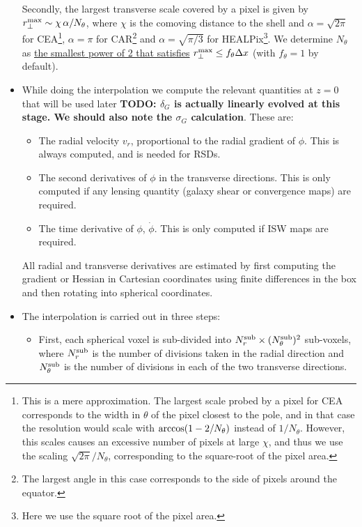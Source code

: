 \documentclass[a4paper,10pt]{article}
\newcommand{\TODO}[1]{{\bf TODO: #1}}
\begin{document}
\begin{itemize}
      Secondly, the largest transverse scale covered by a pixel is given by
      $r_\perp^{\rm max}\sim\chi\,\alpha/N_\theta$, where $\chi$ is the comoving
      distance to the shell and $\alpha=\sqrt{2\pi}$ for CEA\footnote{This is a
        mere approximation. The largest scale probed by a pixel for CEA corresponds
        to the width in $\theta$ of the pixel closest to the pole, and in that 
        case the resolution would scale with ${\rm arccos}(1-2/N_\theta)$ instead
        of $1/N_\theta$. However, this scales causes an excessive number of pixels
        at large $\chi$, and thus we use the scaling $\sqrt{2\pi}/N_\theta$,
        corresponding to the square-root of the pixel area.}, $\alpha=\pi$ for
      CAR\footnote{The largest angle in this case corresponds to the side of
        pixels around the equator.} and $\alpha=\sqrt{\pi/3}$ for
      HEALPix\footnote{Here we use the square root of the pixel area.}. We
      determine $N_\theta$ as \underline{the smallest power of 2 that satisfies}
      $r_\perp^{\rm max}\leq f_\theta\Delta x$ (with $f_\theta=1$ by default).
    \item While doing the interpolation we compute the relevant
      quantities at $z=0$ that will be used later \TODO{$\delta_G$ is actually
        linearly evolved at this stage. We should also note the $\sigma_G$
        calculation}. These are:
      \begin{itemize}
        \item The radial velocity $v_r$, proportional to the radial
          gradient of $\phi$. This is always computed, and is needed
          for RSDs.
        \item The second derivatives of $\phi$ in the transverse directions.
          This is only computed if any lensing quantity (galaxy shear or
          convergence maps) are required.
        \item The time derivative of $\phi$, $\dot{\phi}$. This is only
          computed if ISW maps are required.
      \end{itemize}
      All radial and transverse derivatives are estimated by first computing
      the gradient or Hessian in Cartesian coordinates using finite differences
      in the box and then rotating into spherical coordinates.
      
    \item The interpolation is carried out in three steps:
      \begin{itemize}
        \item First, each spherical voxel is sub-divided into 
          $N_r^{\rm sub}\times (N_\theta^{\rm sub})^2$ sub-voxels, where $N^{\rm sub}_r$
          is the number of divisions taken in the radial direction and $N^{\rm sub}_\theta$ is
          the number of divisions in each of the two transverse directions.
          

\end{itemize}
\end{itemize}
\end{document}
